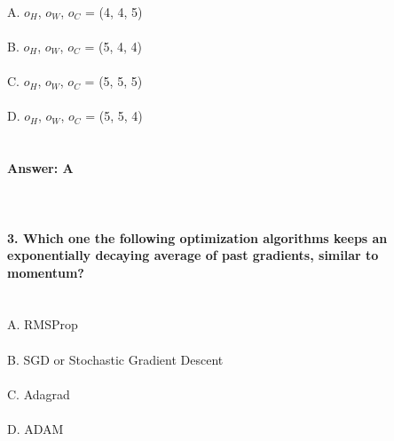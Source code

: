 \documentclass[prl,twocolumn,showpacs,preprintnumbers,superscriptaddress]{revtex4}
\theoremstyle{plain}
\theoremstyle{definition}
\begin{document}
\begin{widetext}
\\
\\
\\
A. $o_{H}$, $o_{W}$, $o_{C}$ = (4, 4, 5)
\\
\\
B. $o_{H}$, $o_{W}$, $o_{C}$ = (5, 4, 4)
\\
\\
C. $o_{H}$, $o_{W}$, $o_{C}$ = (5, 5, 5)
\\
\\
D. $o_{H}$, $o_{W}$, $o_{C}$ = (5, 5, 4)
\\
\\
\\
\textbf{Answer: A}
\\
\\
\\
\\
\textbf{3. Which one the following optimization algorithms keeps an exponentially decaying average of past gradients, similar to momentum?}
\\
\\
\\
A. RMSProp
\\
\\
B. SGD or Stochastic Gradient Descent
\\
\\
C. Adagrad
\\
\\
D. ADAM
\\
\\
\\
\\

\end{widetext}
\end{document}
